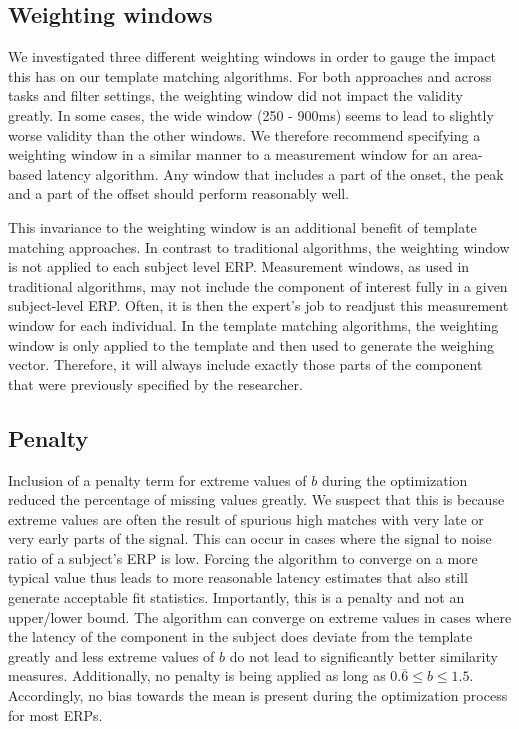 \documentclass[
  man]{apa7}
\begin{document}
\hypertarget{weighting-windows}{%
\subsection{Weighting windows}\label{weighting-windows}}

We investigated three different weighting windows in order to gauge the impact this has on our template matching algorithms. For both approaches and across tasks and filter settings, the weighting window did not impact the validity greatly. In some cases, the wide window (250 - 900ms) seems to lead to slightly worse validity than the other windows. We therefore recommend specifying a weighting window in a similar manner to a measurement window for an area-based latency algorithm. Any window that includes a part of the onset, the peak and a part of the offset should perform reasonably well.

This invariance to the weighting window is an additional benefit of template matching approaches. In contrast to traditional algorithms, the weighting window is not applied to each subject level ERP. Measurement windows, as used in traditional algorithms, may not include the component of interest fully in a given subject-level ERP. Often, it is then the expert's job to readjust this measurement window for each individual. In the template matching algorithms, the weighting window is only applied to the template and then used to generate the weighing vector. Therefore, it will always include exactly those parts of the component that were previously specified by the researcher.

\hypertarget{penalty-1}{%
\subsection{Penalty}\label{penalty-1}}

Inclusion of a penalty term for extreme values of \(b\) during the optimization reduced the percentage of missing values greatly. We suspect that this is because extreme values are often the result of spurious high matches with very late or very early parts of the signal. This can occur in cases where the signal to noise ratio of a subject's ERP is low. Forcing the algorithm to converge on a more typical value thus leads to more reasonable latency estimates that also still generate acceptable fit statistics. Importantly, this is a penalty and not an upper/lower bound. The algorithm can converge on extreme values in cases where the latency of the component in the subject does deviate from the template greatly and less extreme values of \(b\) do not lead to significantly better similarity measures. Additionally, no penalty is being applied as long as \(0.\overline{6} \le b \le 1.5\). Accordingly, no bias towards the mean is present during the optimization process for most ERPs.
\end{document}

